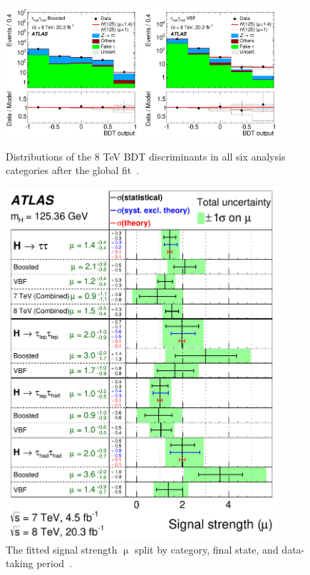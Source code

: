 \begin{figure}[tp]
  \includegraphics[width=0.45\textwidth]{figures/HIGG-2013-32/fig_08f}
  \includegraphics[width=0.45\textwidth]{figures/HIGG-2013-32/fig_08e}
  \caption{Distributions of the 8 TeV BDT discriminants in all six analysis categories after the global fit~\cite{HIGG-2013-32}.}
  \label{fig:results-bdts}
\end{figure}
\clearpage

\begin{figure}[tp]
  \centering
  \includegraphics[width=0.90\textwidth]{figures/HIGG-2013-32/fig_09}
  \caption{The fitted signal strength $\upmu$ split by category, final state, and data-taking period~\cite{HIGG-2013-32}.}
  \label{fig:results-musummary}
\end{figure}

